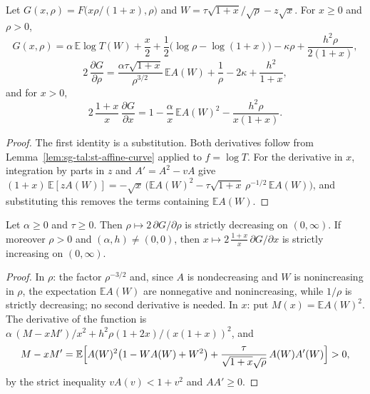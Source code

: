 \begin{lemma}\label{lem:sg-tal:st-hard-derivatives}
  \leanok
Let $G(x,\rho)=F\bigl(x\rho/(1+x),\rho\bigr)$ and $W=\tau\sqrt{1+x}/\sqrt\rho-z\sqrt x$. For $x\ge0$ and $\rho>0$,
\[
G(x,\rho)=\alpha\,\mathbb E\log T(W)+\frac x2+\frac12\bigl(\log\rho-\log(1+x)\bigr)-\kappa\rho
+\frac{h^2\rho}{2(1+x)},
\]
\[
2\,\frac{\partial G}{\partial\rho}=\frac{\alpha\tau\sqrt{1+x}}{\rho^{3/2}}\,\mathbb E A(W)+\frac1\rho-2\kappa
+\frac{h^2}{1+x},
\]
and for $x>0$,
\[
2\,\frac{1+x}{x}\,\frac{\partial G}{\partial x}=1-\frac\alpha x\,\mathbb E A(W)^2-\frac{h^2\rho}{x(1+x)} .
\]
\end{lemma}
\begin{proof}
  \leanok
The first identity is a substitution. Both derivatives follow from Lemma~\ref{lem:sg-tal:st-affine-curve}
applied to $f=\log T$. For the derivative in $x$, integration by parts in $z$ and $A'=A^2-vA$ give
$(1+x)\,\mathbb E[zA(W)]=-\sqrt x\,\bigl(\mathbb EA(W)^2-\tau\sqrt{1+x}\,\rho^{-1/2}\,\mathbb EA(W)\bigr)$, and
substituting this removes the terms containing $\mathbb EA(W)$.
\end{proof}

\begin{lemma}\label{lem:sg-tal:st-hard-monotone}
  \leanok
Let $\alpha\ge0$ and $\tau\ge0$. Then $\rho\mapsto2\,\partial G/\partial\rho$ is strictly decreasing on
$(0,\infty)$. If moreover $\rho>0$ and $(\alpha,h)\ne(0,0)$, then
$x\mapsto2\,\frac{1+x}{x}\,\partial G/\partial x$ is strictly increasing on $(0,\infty)$.
\end{lemma}
\begin{proof}
  \leanok
In $\rho$: the factor $\rho^{-3/2}$ and, since $A$ is nondecreasing and $W$ is nonincreasing in $\rho$, the
expectation $\mathbb EA(W)$ are nonnegative and nonincreasing, while $1/\rho$ is strictly decreasing; no second
derivative is needed. In $x$: put $M(x)=\mathbb EA(W)^2$. The derivative of the function is
$\alpha\,(M-xM')/x^2+h^2\rho(1+2x)/(x(1+x))^2$, and
\[
M-xM'=\mathbb E\Bigl[A(W)^2\bigl(1-WA(W)+W^2\bigr)+\frac{\tau}{\sqrt{1+x}\sqrt\rho}\,A(W)A'(W)\Bigr]>0,
\]
by the strict inequality $vA(v)<1+v^2$ and $AA'\ge0$.
\end{proof}

